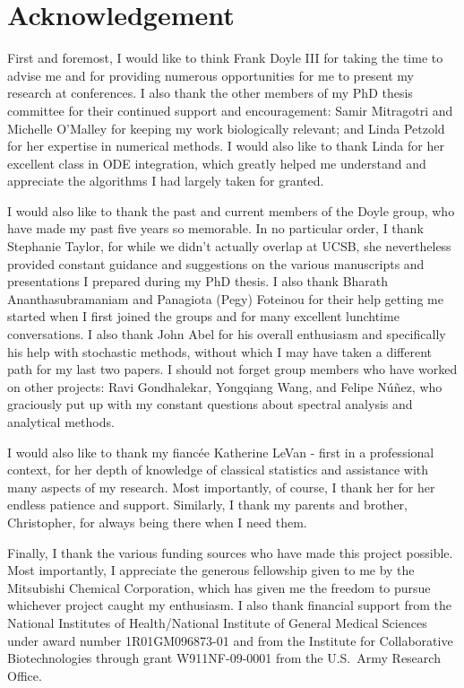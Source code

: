 \chapter*{Acknowledgement}

{\singlespace

First and foremost, I would like to think Frank Doyle III for taking the time to advise me and for providing numerous opportunities for me to present my research at conferences.
I also thank the other members of my PhD thesis committee for their continued support and encouragement: Samir Mitragotri and Michelle O'Malley for keeping my work biologically relevant; and Linda Petzold for her expertise in numerical methods.
I would also like to thank Linda for her excellent class in ODE integration, which greatly helped me understand and appreciate the algorithms I had largely taken for granted.

I would also like to thank the past and current members of the Doyle group, who have made my past five years so memorable.
In no particular order, I thank Stephanie Taylor, for while we didn't actually overlap at UCSB, she nevertheless provided constant guidance and suggestions on the various manuscripts and presentations I prepared during my PhD thesis.
I also thank Bharath Ananthasubramaniam and Panagiota (Pegy) Foteinou for their help getting me started when I first joined the groups and for many excellent lunchtime conversations.
I also thank John Abel for his overall enthusiasm and specifically his help with stochastic methods, without which I may have taken a different path for my last two papers.
I should not forget group members who have worked on other projects: Ravi Gondhalekar, Yongqiang Wang, and Felipe N\'{u}\~{n}ez, who graciously put up with my constant questions about spectral analysis and analytical methods.

I would also like to thank my fianc\'{e}e Katherine LeVan - first in a professional context, for her depth of knowledge of classical statistics and assistance with many aspects of my research.
Most importantly, of course, I thank her for her endless patience and support. 
Similarly, I thank my parents and brother, Christopher, for always being there when I need them.

Finally, I thank the various funding sources who have made this project possible.
Most importantly, I appreciate the generous fellowship given to me by the Mitsubishi Chemical Corporation, which has given me the freedom to pursue whichever project caught my enthusiasm.
I also thank financial support from the National Institutes of Health/National Institute of General Medical Sciences under award number 1R01GM096873-01 and from the Institute for Collaborative Biotechnologies through grant W911NF-09-0001 from the U.S.\ Army Research Office.

}


